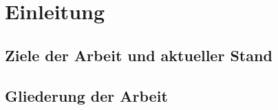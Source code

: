 \chapter{Einleitung}
\label{cha:Einleitung}

\section{Ziele der Arbeit und aktueller Stand}


\section{Gliederung der Arbeit}
